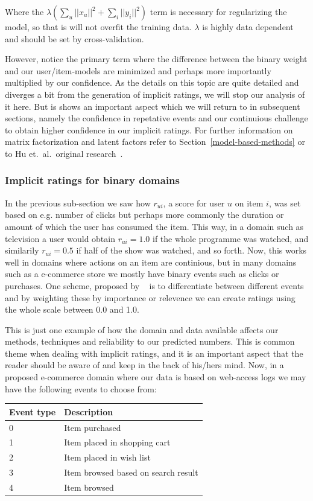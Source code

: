 Where the $\lambda (\sum _{u} || x_u ||^2 + \sum_{i} || y_i ||^2)$ term is
necessary for regularizing the model, so that is will not overfit the
training data. $\lambda$ is highly data dependent and should be set by
cross-validation.

However, notice the primary term where the difference between the binary weight
and our user/item-models are minimized and perhaps more importantly multiplied
by our confidence. As the details on this topic are quite detailed and diverges
a bit from the generation of implicit ratings, we will stop our analysis of it
here. But is shows an important aspect which we will return to in subsequent
sections, namely the confidence in repetative events and our continuious
challenge to obtain higher confidence in our implicit ratings. For further
information on matrix factorization and latent factors refer to
Section~\ref{model-based-methods} or to Hu et.\ al.\ original
research~\cite{Hu2008}.

\subsubsection{Implicit ratings for binary domains}

In the previous sub-section we saw how $r_{ui}$, a score for user $u$ on item
$i$, was set based on e.g. number of clicks but perhaps more commonly the
duration or amount of which the user has consumed the item. This way, in a
domain such as television a user would obtain $r_{ui} = 1.0$ if the whole
programme was watched, and similarily $r_{ui} = 0.5$ if half of the show was
watched, and so forth. Now, this works well in domains where actions on an item
are continious, but in many domains such as a e-commerce store we mostly have
binary events such as clicks or purchases. One scheme, proposed by
~\cite{pkghost2014implicit} is to differentiate between different events and by
weighting these by importance or relevence we can create ratings using the
whole scale between 0.0 and 1.0.

This is just one example of how the domain and data available affects our
methods, techniques and reliability to our predicted numbers. This is common
theme when dealing with implicit ratings, and it is an important aspect that
the reader should be aware of and keep in the back of his/hers mind. Now, in a
proposed e-commerce domain where our data is based on web-access logs we may
have the following events to choose from:

\begin{table}[H]
  \centering
  \begin{tabular}{ll}
  \toprule
  Event type & Description \\ \midrule
  0 & Item purchased \\
  1 & Item placed in shopping cart \\
  2 & Item placed in wish list \\
  3 & Item browsed based on search result \\
  4 & Item browsed \\
  \bottomrule
  \end{tabular}
\end{table}

